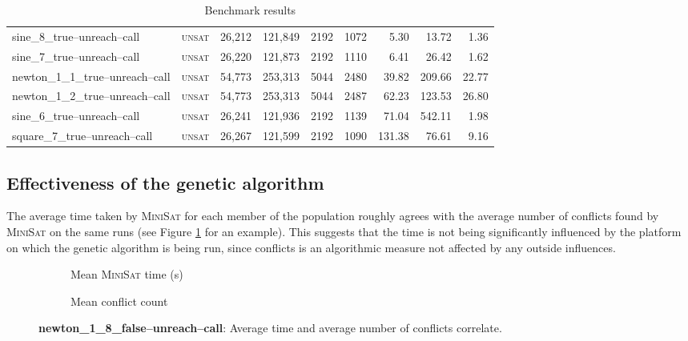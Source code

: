 \documentclass[proof,pdftex,11pt,a4,titlepage]{article}
\newcommand{\unsat}{\textsc{unsat}}
\begin{document}
\begin{table}
\begin{minipage}{\textwidth+3cm}
\begin{tabular}{|l|crr|rr|rrr|}
      sine\_8\_true--unreach--call & \unsat{} & 26,212 & 121,849 & 2192 & 1072 & 5.30 & 13.72 & 1.36 \\
      sine\_7\_true--unreach--call & \unsat{} & 26,220 & 121,873 & 2192 & 1110 & 6.41 & 26.42 & 1.62 \\
      newton\_1\_1\_true--unreach--call & \unsat{} & 54,773 & 253,313 &  5044 & 2480 & 39.82 & 209.66 & 22.77  \\
      newton\_1\_2\_true--unreach--call & \unsat{} & 54,773 & 253,313 &  5044 & 2487 & 62.23 & 123.53 & 26.80  \\
      sine\_6\_true--unreach--call & \unsat{} & 26,241 & 121,936 & 2192 & 1139 & 71.04 & 542.11 & 1.98  \\
      square\_7\_true--unreach--call & \unsat{} & 26,267 & 121,599 & 2192 & 1090 & 131.38 & 76.61 & 9.16 \\
      \hline
    \end{tabular}
    \caption{Benchmark results}
    \label{table:results}
  \end{minipage}
\end{table}

\subsection{Effectiveness of the genetic algorithm}

The average time taken by \textsc{MiniSat} for each member of the population roughly agrees with the average number of conflicts found by \textsc{MiniSat} on the same runs (see Figure \ref{fig:time-conflicts} for an example). This suggests that the time is not being significantly influenced by the platform on which the genetic algorithm is being run, since conflicts is an algorithmic measure not affected by any outside influences.

\begin{figure}[h]
  \begin{subfigure}[H]{0.5\textwidth}
    \vspace{2mm}
    
    \caption{Mean \textsc{MiniSat} time (s)}
  \end{subfigure}
  \begin{subfigure}[H]{0.5\textwidth}
    
    \caption{Mean conflict count}
  \end{subfigure}
  \caption{{\bf newton\_1\_8\_false--unreach--call}: Average time and average number of conflicts correlate.}
  \label{fig:time-conflicts}
\end{figure}
\end{document}
